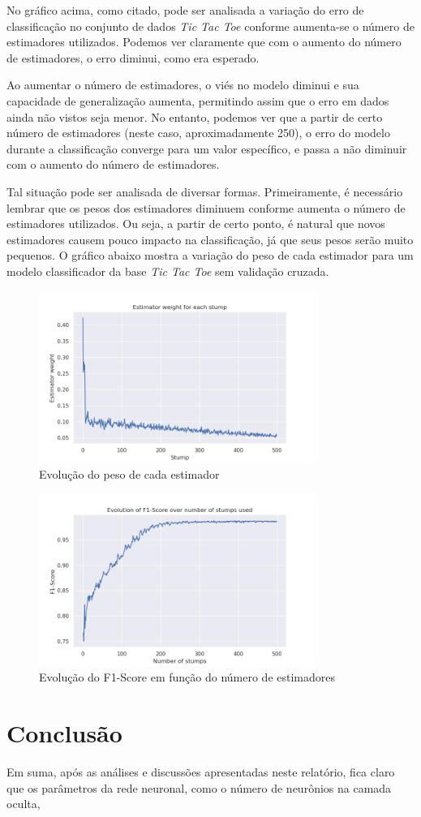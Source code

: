 \documentclass{article}
\begin{document}
No gráfico acima, como citado, pode ser analisada a variação do erro de
classificação no conjunto de
dados \textit{Tic Tac Toe} conforme aumenta-se o número de estimadores
utilizados. Podemos ver claramente que
com o aumento do número de estimadores, o erro diminui, como era esperado.

Ao aumentar o número de estimadores, o viés no modelo diminui e sua capacidade
de generalização aumenta,
permitindo assim que o erro em dados ainda não vistos seja menor. No entanto,
podemos ver que a partir de certo número
de estimadores (neste caso, aproximadamente 250), o erro do modelo durante a
classificação converge
para um valor específico, e passa a não diminuir com o aumento do número de
estimadores.

Tal situação pode ser analisada de diversar formas. Primeiramente, é necessário
lembrar que os pesos dos estimadores
diminuem conforme aumenta o número de estimadores utilizados. Ou seja, a partir
de certo ponto, é natural que
novos estimadores causem pouco impacto na classificação, já que seus pesos
serão muito pequenos. O gráfico abaixo
mostra a variação do peso de cada estimador para um modelo classificador da
base \textit{Tic Tac Toe} sem validação cruzada.



\begin{figure}[H]
    \centering
    \includegraphics[width=0.8\textwidth]{images/Estimatorweight.png}
    \caption{Evolução do peso de cada estimador}
\end{figure}

\begin{figure}[H]
    \centering
    \includegraphics[width=0.8\textwidth]{images/F1-Score.png}
    \caption{Evolução do F1-Score em função do número de estimadores}
\end{figure}

\section{Conclusão}

Em suma, após as análises e discussões apresentadas neste relatório, fica claro
que os parâmetros da rede neuronal, como o número de neurônios na camada
oculta,
\end{document}
